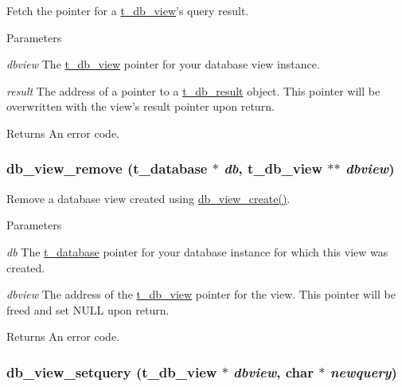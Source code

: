 Fetch the pointer for a \hyperlink{group__database_gac9ea40a519578e26498dd61ea98b5cf2}{t\_\-db\_\-view}'s query result. 
\begin{DoxyParams}{Parameters}
\item[{\em dbview}]The \hyperlink{group__database_gac9ea40a519578e26498dd61ea98b5cf2}{t\_\-db\_\-view} pointer for your database view instance. \item[{\em result}]The address of a pointer to a \hyperlink{group__database_gae34db00cb98960e94b5ca58a7c21c362}{t\_\-db\_\-result} object. This pointer will be overwritten with the view's result pointer upon return. \end{DoxyParams}
\begin{DoxyReturn}{Returns}
An error code. 
\end{DoxyReturn}
\hypertarget{group__database_ga0e0c3cfbb3459545a4868630cf6e8807}{
\subsubsection[{db\_\-view\_\-remove}]{ db\_\-view\_\-remove ({\bf t\_\-database} $\ast$ {\em db}, \/  {\bf t\_\-db\_\-view} $\ast$$\ast$ {\em dbview})}}
\label{group__database_ga0e0c3cfbb3459545a4868630cf6e8807}


Remove a database view created using \hyperlink{group__database_ga70b24ae188489537db137f67f5d01388}{db\_\-view\_\-create()}. 
\begin{DoxyParams}{Parameters}
\item[{\em db}]The \hyperlink{group__database_gad832ea0e5fc292661fd20046cee7e3b3}{t\_\-database} pointer for your database instance for which this view was created. \item[{\em dbview}]The address of the \hyperlink{group__database_gac9ea40a519578e26498dd61ea98b5cf2}{t\_\-db\_\-view} pointer for the view. This pointer will be freed and set NULL upon return. \end{DoxyParams}
\begin{DoxyReturn}{Returns}
An error code. 
\end{DoxyReturn}
\hypertarget{group__database_ga0474ea3231e953760e5a32a277c0279d}{
\subsubsection[{db\_\-view\_\-setquery}]{ db\_\-view\_\-setquery ({\bf t\_\-db\_\-view} $\ast$ {\em dbview}, \/  char $\ast$ {\em newquery})}}
\label{group__database_ga0474ea3231e953760e5a32a277c0279d}


